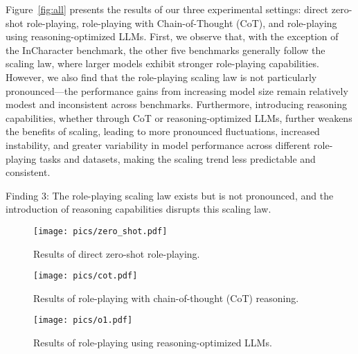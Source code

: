 Figure~\ref{fig:all} presents the results of our three experimental settings: direct zero-shot role-playing, role-playing with Chain-of-Thought (CoT), and role-playing using reasoning-optimized LLMs. 
First, we observe that, with the exception of the InCharacter benchmark, the other five benchmarks generally follow the scaling law, where larger models exhibit stronger role-playing capabilities. 
However, we also find that the role-playing scaling law is not particularly pronounced—the performance gains from increasing model size remain relatively modest and inconsistent across benchmarks. 
Furthermore, introducing reasoning capabilities, whether through CoT or reasoning-optimized LLMs, further weakens the benefits of scaling, leading to more pronounced fluctuations, increased instability, and greater variability in model performance across different role-playing tasks and datasets, making the scaling trend less predictable and consistent.

\begin{AIbox}
{Finding 3:}
The role-playing scaling law exists but is not pronounced, and the introduction of reasoning capabilities disrupts this scaling law.
\end{AIbox}


\begin{figure*}[!htb]
    \centering
    \begin{subfigure}[b]{\textwidth}
        \centering
        \texttt{[image: pics/zero\_shot.pdf]}
        \caption{Results of direct zero-shot role-playing.}
        \label{fig:zero_shot}
    \end{subfigure}
    
    \begin{subfigure}[b]{\textwidth}
        \centering
        \texttt{[image: pics/cot.pdf]}
        \caption{Results of role-playing with chain-of-thought (CoT) reasoning.}
        \label{fig:cot}
    \end{subfigure}

    \begin{subfigure}[b]{\textwidth}
        \centering
        \texttt{[image: pics/o1.pdf]}
        \caption{Results of role-playing using reasoning-optimized LLMs.}
        \label{fig:o1}
    \end{subfigure}

    \caption{Performance comparison of different models across six benchmarks. The horizontal axis represents model size, arranged from smallest to largest, while the vertical axis denotes benchmark-specific evaluation metrics, where higher values indicate better role-playing performance. Within each benchmark, different color gradients represent the performance curves for its respective sub-datasets.}
    \label{fig:all}
\end{figure*}



